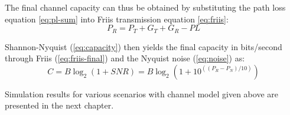 The final channel capacity can thus be obtained by substituting the path loss equation \ref{eq:pl-sum} into 
Friis transmission equation \ref{eq:friis}: 
\begin{equation} \label{eq:friis-final}
    P_R = P_T + G_T + G_R - PL
\end{equation}

Shannon-Nyquist (\ref{eq:capacity}) then yields the final capacity in bits/second through Friis (\ref{eq:friis-final}) 
and the Nyquist noise (\ref{eq:noise}) as: 
\begin{equation} \label{eq:capacity}
    C = B \log_2(1 + SNR) = B \log_2(1 + 10^{( (P_R-P_N) / 10 )} )
\end{equation}


Simulation results for various scenarios with channel model given above are presented in the next chapter.


